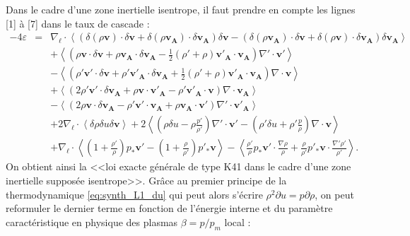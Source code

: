 Dans le cadre d'une zone inertielle isentrope, il faut prendre en compte les lignes [1] à [7] dans le taux de cascade :
\begin{equation}
\boxed{
\begin{array}{lcl}
\label{eq:turb_elg_f1} -4\varepsilon &=& \nabla_{\boldsymbol{\ell}} \cdot \left<\left(\delta \left(\rho\boldsymbol{v}\right) \cdot \delta \boldsymbol{v}+ \delta \left(\rho\boldsymbol{v_A}\right) \cdot \delta \boldsymbol{v_A} \right)\delta \boldsymbol{v}  -\left(\delta \left(\rho\boldsymbol{v_A}\right) \cdot \delta \boldsymbol{v}  + \delta \left(\rho\boldsymbol{v}\right) \cdot \delta \boldsymbol{v_A}  \right) \delta \boldsymbol{v_A} \right>\\
&& +\left< \left(\rho \boldsymbol{v} \cdot \delta \boldsymbol{v} +\rho \boldsymbol{v_A} \cdot \delta \boldsymbol{v_A} -\frac{1}{2} \left(\rho'+\rho\right) \boldsymbol{v'_A} \cdot \boldsymbol{v_A} \right) \nabla' \cdot \boldsymbol{v'} \right>\\
&& -\left< \left(\rho' \boldsymbol{v'} \cdot \delta \boldsymbol{v} + \rho' \boldsymbol{v'_A} \cdot \delta \boldsymbol{v_A} + \frac{1}{2} \left(\rho'+\rho\right) \boldsymbol{v'_A} \cdot \boldsymbol{v_A}  \right)\nabla \cdot \boldsymbol{v}\right>\\
&&+ \left<\left(2 \rho' \boldsymbol{v'} \cdot \delta \boldsymbol{v_A}+\rho \boldsymbol{v} \cdot \boldsymbol{v'_A} - \rho' \boldsymbol{v'_A} \cdot \boldsymbol{v}  \right)\nabla \cdot \boldsymbol{v_A}\right>\\
&&- \left<\left(2\rho \boldsymbol{v} \cdot \delta \boldsymbol{v_A} -\rho' \boldsymbol{v'} \cdot \boldsymbol{v_A} +  \rho \boldsymbol{v_A} \cdot \boldsymbol{v'} \right)\nabla' \cdot \boldsymbol{v'_A}\right> \\
&&+ 2 \nabla_{\boldsymbol{\ell}} \cdot \left<\delta \rho  \delta u \delta \boldsymbol{v}\right> + 2\left<\left(\rho \delta u- \rho \frac{p'}{\rho'}\right)\nabla' \cdot \boldsymbol{v'}  - \left(\rho' \delta u + \rho' \frac{p}{\rho}\right) \nabla \cdot \boldsymbol{v} \right>\\
&&+  \nabla_{\boldsymbol{\ell}} \cdot \left< \left(1+\frac{\rho'}{\rho}\right)p_*  \boldsymbol{v'} -  \left(1+\frac{\rho}{\rho'}\right)p'_*  \boldsymbol{v} \right>- \left<\frac{\rho'}{\rho} p_*  \boldsymbol{v'} \cdot \frac{\nabla \rho}{\rho} + \frac{\rho}{\rho'} p'_*  \boldsymbol{v} \cdot \frac{\nabla' \rho'}{\rho'} \right>.
\end{array}}
\end{equation} 
On obtient ainsi la <<loi exacte générale de type \acs{K41} dans le cadre d'une zone inertielle supposée isentrope>>. Grâce au premier principe de la thermodynamique \eqref{eq:synth_L1_du} qui peut alors s'écrire $\rho^2 \partial u = p \partial \rho $, on peut reformuler le dernier terme en fonction de l'énergie interne et du paramètre caractéristique en physique des plasmas $\beta = p/p_m$ local :
